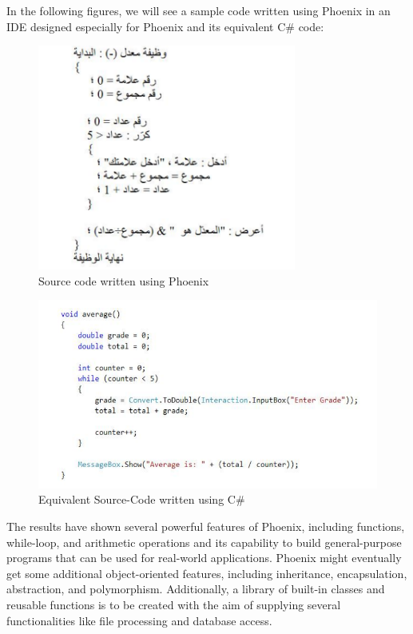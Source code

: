 In the following figures, we will see a sample code written using Phoenix in an IDE designed especially for Phoenix and its equivalent C\# code:

\begin{figure}[H]
\centering
\includegraphics[width=8.5cm]{ch2-images/phoenix4.png}
\caption{Source code written using Phoenix \cite{bassil2019phoenix}}
\label{fig:Source code written using Phoenix}
\end{figure}

\begin{figure}[H]
\centering
\includegraphics[width=15cm]{ch2-images/phoenix5.png}
\caption{Equivalent Source-Code written using C\# \cite{bassil2019phoenix}}
\label{fig:Equivalent Source-Code written using C\#}
\end{figure}

The results have shown several powerful features of Phoenix, including functions, while-loop, and arithmetic operations and its capability to build general-purpose programs that can be used for real-world applications. Phoenix might eventually get some additional object-oriented features, including inheritance, encapsulation, abstraction, and polymorphism. Additionally, a library of built-in classes and reusable functions is to be created with the aim of supplying several functionalities like file processing and database access.
